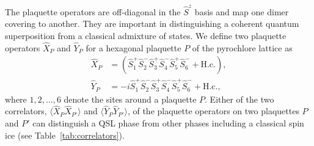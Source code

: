 \documentclass[twocolumn,superscriptaddress,amsmath,amssymb,aps,prx,nofootinbib]{revtex4-2}
\begin{document}
 The plaquette operators are  off-diagonal in the $\hat{S}^z$ basis and map one dimer covering to another. They are important in distinguishing a coherent quantum superposition from a classical admixture of states. We define two plaquette operators $\hat{X}_P$ and $\hat{Y}_P$ for a hexagonal plaquette $P$ of the pyrochlore lattice as 
 \begin{equation} \label{eq:xp_yp_def}
  \begin{aligned}
    \hat{X}_{P} &=  \left( \hat{S}_1^+ \hat{S}_2^-\hat{S}_3^+\hat{S}_4^-\hat{S}_5^+\hat{S}_6^-   + \text{H.c.} \right) ,\\
      \hat{Y}_{P} & = -i \hat{S}_1^+ \hat{S}_2^-\hat{S}_3^+\hat{S}_4^-\hat{S}_5^+\hat{S}_6^-   + \text{H.c.},
\end{aligned}
\end{equation}
where $1,2,\ldots,6$ denote the sites around a plaquette $P$. Either of the two correlators, $\langle \hat{X}_P \hat{X}_{P'} \rangle $ and $\langle \hat{Y}_P \hat{Y}_{P'} \rangle $, of the plaquette operators on two plaquettes $P$ and $P'$ can distinguish a QSL phase from other phases including a classical spin ice (see Table~\ref{tab:correlators}). 
\end{document}
